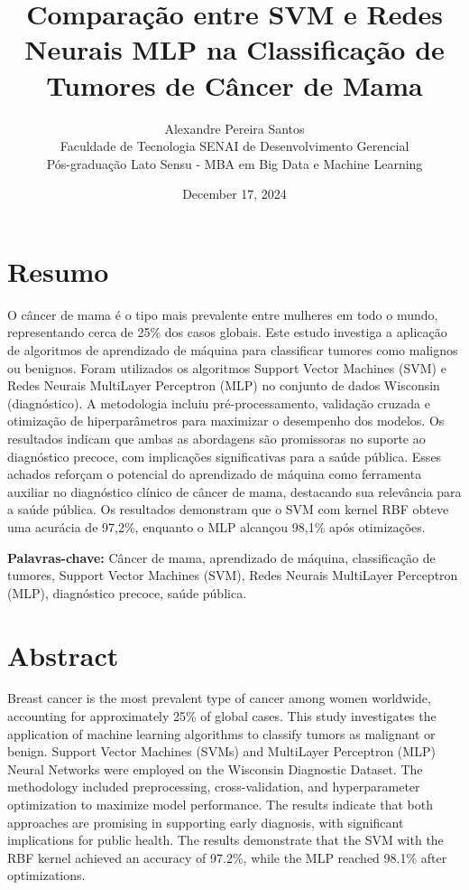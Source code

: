 \documentclass[12pt,a4paper,oneside,openany]{article}
\title{Comparação entre SVM e Redes Neurais MLP na Classificação de Tumores de Câncer de Mama}
\author{Alexandre Pereira Santos\\
Faculdade de Tecnologia SENAI de Desenvolvimento Gerencial\\
Pós-graduação Lato Sensu - MBA em Big Data e Machine Learning}
\date{December 17, 2024}
\begin{document}
\maketitle

\section*{Resumo}
O câncer de mama é o tipo mais prevalente entre mulheres em todo o mundo, representando cerca de 25\% dos casos globais. Este estudo investiga a aplicação de algoritmos de aprendizado de máquina para classificar tumores como malignos ou benignos. Foram utilizados os algoritmos Support Vector Machines (SVM) e Redes Neurais MultiLayer Perceptron (MLP) no conjunto de dados Wisconsin (diagnóstico). A metodologia incluiu pré-processamento, validação cruzada e otimização de hiperparâmetros para maximizar o desempenho dos modelos. Os resultados indicam que ambas as abordagens são promissoras no suporte ao diagnóstico precoce, com implicações significativas para a saúde pública. Esses achados reforçam o potencial do aprendizado de máquina como ferramenta auxiliar no diagnóstico clínico de câncer de mama, destacando sua relevância para a saúde pública. Os resultados demonstram que o SVM com kernel RBF obteve uma acurácia de 97,2\%, enquanto o MLP alcançou 98,1\% após otimizações.

\noindent \textbf{Palavras-chave:} Câncer de mama, aprendizado de máquina, classificação de tumores, Support Vector Machines (SVM), Redes Neurais MultiLayer Perceptron (MLP), diagnóstico precoce, saúde pública.

\section*{Abstract}
Breast cancer is the most prevalent type of cancer among women worldwide, accounting for approximately 25\% of global cases. This study investigates the application of machine learning algorithms to classify tumors as malignant or benign. Support Vector Machines (SVMs) and MultiLayer Perceptron (MLP) Neural Networks were employed on the Wisconsin Diagnostic Dataset. The methodology included preprocessing, cross-validation, and hyperparameter optimization to maximize model performance. The results indicate that both approaches are promising in supporting early diagnosis, with significant implications for public health. The results demonstrate that the SVM with the RBF kernel achieved an accuracy of 97.2\%, while the MLP reached 98.1\% after optimizations.
\end{document}
